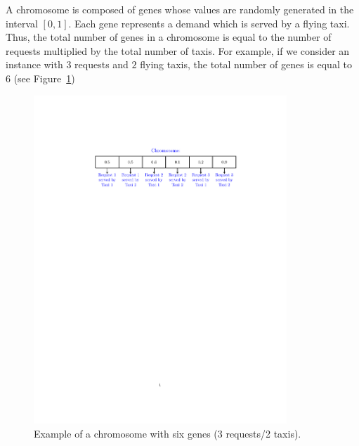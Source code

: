 A chromosome is composed of genes whose values are randomly generated in the interval $[0,1]$.  Each gene represents a demand which is served by a flying taxi. Thus, the total number of genes in a chromosome is equal to the number of requests multiplied by the total number of taxis. For example, if we consider an instance with $3$ requests and $2$ flying taxis, the total number of genes is equal to $6$ (see Figure~\ref{fig:chromo})

\begin{figure}
	\includegraphics[trim=120 570 120 125,clip,width=0.85\textwidth]{images/chromosome.pdf}
	\caption{Example of a chromosome with six genes (3 requests/2 taxis).}
	\label{fig:chromo}
\end{figure}






